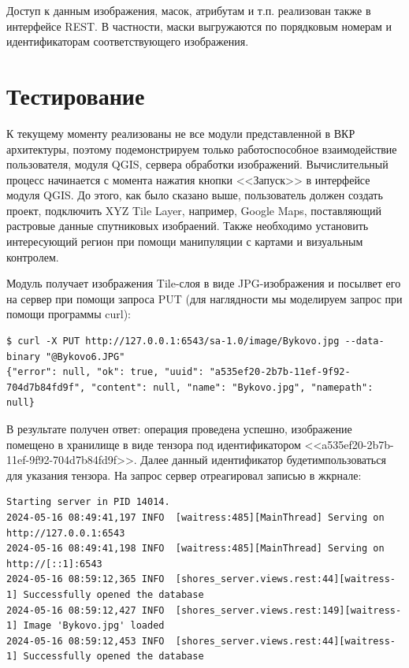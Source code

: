\documentclass[732,14pt,final]{studrep}
\begin{document}
Доступ к данным изображения, масок, атрибутам и т.п. реализован также в интерфейсе REST. В частности, маски выгружаются по порядковым номерам и идентификаторам соответствующего изображения.

\section{Тестирование}

К текущему моменту реализованы не все модули представленной в ВКР архитектуры, поэтому подемонстрируем только работоспособное взаимодействие пользователя, модуля QGIS, сервера обработки изображений. Вычислительный процесс начинается с момента нажатия кнопки <<Запуск>> в интерфейсе модуля QGIS. До этого, как было сказано выше, пользователь должен создать проект, подключить XYZ Tile Layer, например, Google Maps, поставляющий растровые данные спутниковых изобраений. Также необходимо установить интересующий регион при помощи манипуляции с картами и визуальным контролем.

Модуль получает изображения Tile-слоя в виде JPG-изображения и посылвет его на сервер при помощи запроса PUT (для наглядности мы моделируем запрос при помощи программы curl):
\begin{verbatim}
$ curl -X PUT http://127.0.0.1:6543/sa-1.0/image/Bykovo.jpg --data-binary "@Bykovo6.JPG"
{"error": null, "ok": true, "uuid": "a535ef20-2b7b-11ef-9f92-704d7b84fd9f", "content": null, "name": "Bykovo.jpg", "namepath": null}
\end{verbatim}

В результате получен ответ: операция проведена успешно, изображение помещено в хранилище в виде тензора под идентификатором <<a535ef20-2b7b-11ef-9f92-704d7b84fd9f>>. Далее данный идентификатор будетимпользоваться для указания тензора. На запрос сервер отреагировал записью в жкрнале:

\begin{verbatim}
Starting server in PID 14014.
2024-05-16 08:49:41,197 INFO  [waitress:485][MainThread] Serving on http://127.0.0.1:6543
2024-05-16 08:49:41,198 INFO  [waitress:485][MainThread] Serving on http://[::1]:6543
2024-05-16 08:59:12,365 INFO  [shores_server.views.rest:44][waitress-1] Successfully opened the database
2024-05-16 08:59:12,427 INFO  [shores_server.views.rest:149][waitress-1] Image 'Bykovo.jpg' loaded
2024-05-16 08:59:12,453 INFO  [shores_server.views.rest:44][waitress-1] Successfully opened the database
\end{verbatim}
\end{document}
